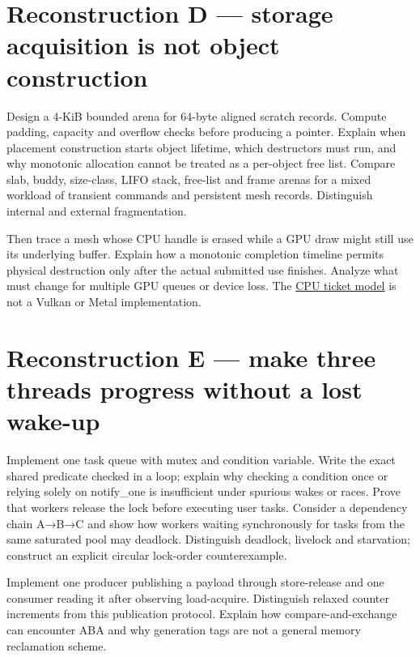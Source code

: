 \section{Reconstruction D --- storage acquisition is not object construction}\label{appendix-2587680a4fe3-reconstruction-d-storage-acquisition-is-not-object-construction}

Design a 4-KiB bounded arena for 64-byte aligned scratch records. Compute padding, capacity and overflow checks before producing a pointer. Explain when placement construction starts object lifetime, which destructors must run, and why monotonic allocation cannot be treated as a per-object free list. Compare slab, buddy, size-class, LIFO stack, free-list and frame arenas for a mixed workload of transient commands and persistent mesh records. Distinguish internal and external fragmentation.

Then trace a mesh whose CPU handle is erased while a GPU draw might still use its underlying buffer. Explain how a monotonic completion timeline permits physical destruction only after the actual submitted use finishes. Analyze what must change for multiple GPU queues or device loss. The \href{tools/labs/phase4_cpu_systems_lab.cpp}{CPU ticket model} is not a Vulkan or Metal implementation.

\section{Reconstruction E --- make three threads progress without a lost wake-up}\label{appendix-2587680a4fe3-reconstruction-e-make-three-threads-progress-without-a-lost-wake-up}

Implement one task queue with mutex and condition variable. Write the exact shared predicate checked in a loop; explain why checking a condition once or relying solely on notify\_one is insufficient under spurious wakes or races. Prove that workers release the lock before executing user tasks. Consider a dependency chain A→B→C and show how workers waiting synchronously for tasks from the same saturated pool may deadlock. Distinguish deadlock, livelock and starvation; construct an explicit circular lock-order counterexample.

Implement one producer publishing a payload through store-release and one consumer reading it after observing load-acquire. Distinguish relaxed counter increments from this publication protocol. Explain how compare-and-exchange can encounter ABA and why generation tags are not a general memory reclamation scheme.

